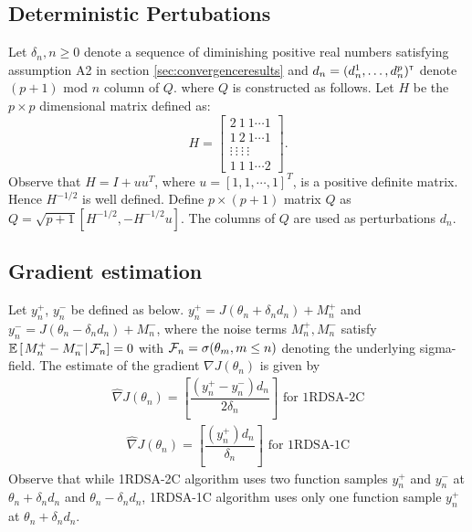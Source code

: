 \documentclass[letterpaper, 10 pt, conference]{ieeeconf}  %
\begin{document}
\subsection{Deterministic Pertubations}
Let $\delta_n, n\geq 0$ denote a sequence of diminishing positive real numbers satisfying 
assumption A2 in section \ref{sec:convergenceresults} and 
$d_n = (d_n^1,\ldots,d_n^p)^\mathsf{\scriptscriptstyle T}$ denote $(p+1)$ mod $n$ column of $Q.$
where $Q$ is constructed as follows. 
Let $H$ be the $p \times p$ dimensional matrix defined as:
\begin{equation}\label{eq:H}
H = \left[\begin{array}{cccc}
2 \ 1 \ 1 \cdots 1\\ 
1 \ 2 \ 1 \cdots 1 \\
\vdots \ \vdots \ \vdots \ \vdots\\
1 \ 1 \ 1 \cdots 2
\end{array}\right].
\end{equation}
Observe that $H=I+uu^T$, where $u=[1,1,\cdots,1]^T$, is a positive definite matrix. Hence $H^{-1/2}$ is well defined.
Define $p\times (p+1)$ matrix $Q$ as $Q=\sqrt{p+1}[H^{-1/2},-H^{-1/2}u].$ The columns of
$Q$ are used as perturbations $d_n.$
\subsection{Gradient estimation}
Let $y_{n}^{+}$, $y_{n}^{-}$  be defined as below.
$y_{n}^{+} = J(\theta_n+\delta_n d_n) + M_{n}^{+}$ and 
$y_{n}^{-} = J(\theta_n-\delta_n d_n) + M_{n}^{-}$,
where the noise terms $M_{n}^{+}, M_{n}^{-}$ satisfy $\mathbb{E}\left[\left.M_{n}^{+}- 
M_{n}^{-}\right| \mathcal{F}_n\right] = 0$ with $\mathcal{F}_n = \sigma(\theta_m, m\le n)$ 
denoting the underlying sigma-field. 
The estimate of the gradient $\nabla J(\theta_n)$ is given by
\begin{align}
\label{eq:grad-twosided}
\widehat\nabla J(\theta_n)=
\left[\dfrac{(y_{n}^{+} - y_{n}^{-})d_n}{2\delta_n}\right] \text{ for 1RDSA-2C}
\end{align}
\begin{align}
\label{eq:grad-onesided}
\widehat\nabla J(\theta_n)=
\left[\dfrac{(y_{n}^{+})d_n}{\delta_n}\right] \text{ for 1RDSA-1C}
\end{align}
Observe that while 1RDSA-2C algorithm uses two function samples $y_{n}^{+}$ and $y_{n}^{-}$ 
at $\theta_n+\delta_n d_n$ and $\theta_n - \delta_n d_n$, 1RDSA-1C algorithm 
uses only one function sample $y_{n}^{+}$ at $\theta_n+\delta_n d_n$.




\end{document}
